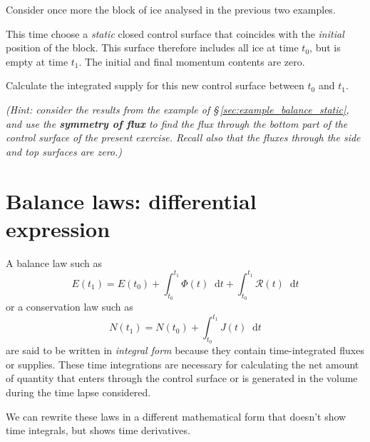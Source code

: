 \documentclass[a4paper,12pt,%
onecolumn,oneside,%
british%
]{memoir}
\newcommand*{\di}{\mathop{}\!\mathrm{d}}%
\renewcommand*{\|}[1][]{\nonscript\:#1\vert\nonscript\:\mathopen{}}
\newcommand*{\sect}{\S}%
\newcommand*{\yti}{t_{0}}
\newcommand*{\ytf}{t_{1}}
\newcommand*{\dt}{\di t}
\newcommand*{\yN}{N}
\newcommand*{\yJ}{J}
\newcommand*{\yE}{E}
\newcommand*{\yH}{\varPhi}%
\newcommand*{\yR}{\mathcal{R}}%
\begin{document}
\medskip

\begin{exercise}
  Consider once more the block of ice analysed in the previous two examples.

  This time choose a \emph{static} closed control surface that coincides with the \emph{initial} position of the block. This surface therefore includes all ice at time $\yti$, but is empty at time $\ytf$. The initial and final momentum contents are zero.

  Calculate the integrated supply for this new control surface between $\yti$ and $\ytf$.

  \emph{(Hint: consider the results from the example of \sect\,\ref{sec:example_balance_static}, and use the \textbf{symmetry of flux} to find the flux through the bottom part of the control surface of the present exercise. Recall also that the fluxes through the side and top surfaces are zero.)}
\end{exercise}







\section{Balance laws: differential expression}
\label{sec:balance_laws_diff}

A balance law such as
\begin{equation*}
  \yE(\ytf) = \yE(\yti)
  + \int_{\yti}^{\ytf}\!\!\yH(t)\dt
  + \int_{\yti}^{\ytf}\!\!\yR(t)\dt
\end{equation*}
or a conservation law such as
\begin{equation*}
    \yN(\ytf) = \yN(\yti) + \int_{\yti}^{\ytf}\!\!\yJ(t)\dt
\end{equation*}
are said to be written in \emph{integral form} because they contain time-integrated fluxes or supplies. These time integrations are necessary for calculating the net amount of quantity that enters through the control surface or is generated in the volume during the time lapse considered.

We can rewrite these laws in a different mathematical form that doesn't show time integrals, but shows time derivatives.
\end{document}
